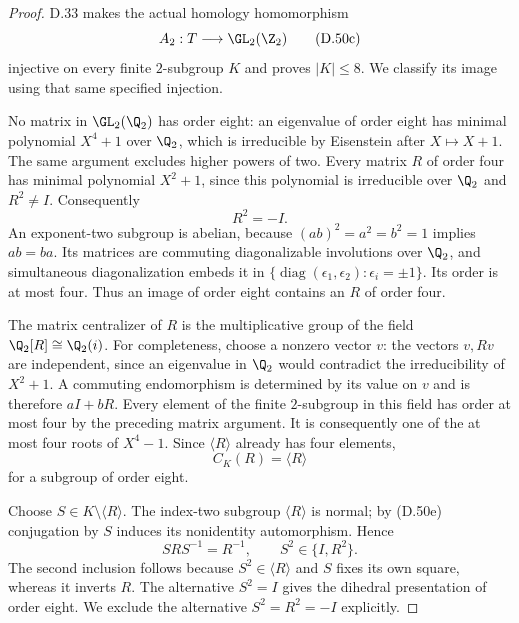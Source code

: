\begin{proof}
D.33 makes the actual homology homomorphism
\[
                     A_2:T\longrightarrow\GL_2(\Z_2)
                                                        \tag{D.50c}
\]
injective on every finite $2$-subgroup $K$ and proves
$|K|\leq8$. We classify its image using that same
specified injection.

No matrix in $\GL_2(\Q_2)$ has order eight:
an eigenvalue of order eight has minimal polynomial
$X^4+1$ over $\Q_2$, which is irreducible by
Eisenstein after $X\mapsto X+1$.
The same argument excludes higher powers of two.
Every matrix $R$ of order four has minimal
polynomial $X^2+1$, since this polynomial is
irreducible over $\Q_2$ and $R^2\ne I$.
Consequently
\[
                         R^2=-I.                       \tag{D.50d}
\]
An exponent-two subgroup is abelian, because
$(ab)^2=a^2=b^2=1$ implies $ab=ba$.
Its matrices are commuting diagonalizable
involutions over $\Q_2$, and simultaneous
diagonalization embeds it in
$\{\operatorname{diag}(\epsilon_1,\epsilon_2):
\epsilon_i=\pm1\}$. Its order is at most four.
Thus an image of order eight contains an $R$
of order four.

The matrix centralizer of $R$ is the multiplicative
group of the field $\Q_2[R]\cong\Q_2(i)$.
For completeness, choose a nonzero vector $v$:
the vectors $v,Rv$ are independent, since an
eigenvalue in $\Q_2$ would contradict the
irreducibility of $X^2+1$.
A commuting endomorphism is determined by its
value on $v$ and is therefore $aI+bR$.
Every element of the finite $2$-subgroup in this
field has order at most four by the preceding
matrix argument. It is consequently one of
the at most four roots of $X^4-1$.
Since $\langle R\rangle$ already has four elements,
\[
                       C_K(R)=\langle R\rangle
                                                        \tag{D.50e}
\]
for a subgroup of order eight.

Choose $S\in K\setminus\langle R\rangle$.
The index-two subgroup $\langle R\rangle$ is normal;
by (D.50e) conjugation by $S$ induces its nonidentity
automorphism. Hence
\[
          SRS^{-1}=R^{-1},\qquad
                    S^2\in\{I,R^2\}.                  \tag{D.50f}
\]
The second inclusion follows because $S^2\in
\langle R\rangle$ and $S$ fixes its own square,
whereas it inverts $R$.
The alternative $S^2=I$ gives the dihedral
presentation of order eight. We exclude the
alternative $S^2=R^2=-I$ explicitly.


\end{proof}
